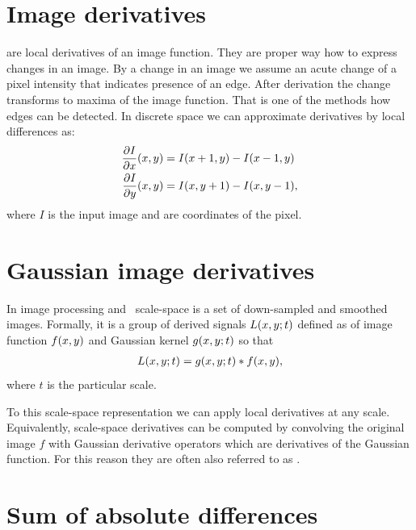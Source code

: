 \section{Image derivatives}
\label{sec:imder}
 are local derivatives of an image function.
They are proper way how to express changes in an image.
By a change in an image we assume an acute change of a pixel intensity that indicates presence of an edge.
After derivation the change transforms to maxima of the image function.
That is one of the methods how edges can be detected.
In discrete space we can approximate derivatives by local differences as:
\begin{align*}
\frac{ \partial I }{  \partial x }(x, y)& = I(x + 1, y) - I(x-1, y)\\
\frac{ \partial I }{  \partial y }(x, y)& = I(x, y + 1) - I(x, y - 1),
\end{align*}
where $I$ is the input image and  are coordinates of the pixel.

\section{Gaussian image derivatives}


In image processing and \cv\ scale-space is a set of down-sampled and smoothed images.
Formally, it is a group of derived signals $L(x, y; t)$ defined as  of image function $f(x, y)$ and Gaussian kernel $g(x, y; t)$
so that
\begin{align*}
L(x, y; t) = g(x, y; t) * f(x, y),
\end{align*}
where $t$ is the particular scale.

To this scale-space representation we can apply local derivatives at any scale.
Equivalently, scale-space derivatives can be computed by convolving the original image $f$ with Gaussian derivative operators which are derivatives of the Gaussian function.
For this reason they are often also referred to as .

\section{Sum of absolute differences}

